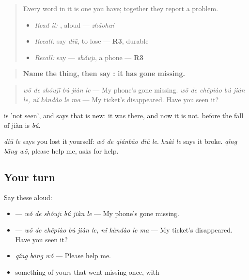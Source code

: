 \begin{quote}
Every word in it is one you have; together they report a problem.

\begin{itemize}
\raggedright
  \item \emph{Read it:} , aloud — \emph{zhǎohuí}
  \item \emph{Recall:} say \emph{diū}, to lose — \textbf{R3}, durable
  \item \emph{Recall:} say  — \emph{shǒujī}, a phone — \textbf{R3}
\end{itemize}
\end{quote}

\begin{grammarlens}[title={Grammar Lens: …\zh{不见了}, it has gone missing}]
\begin{quote}
\textbf{Name the thing, then say : it has gone missing.}
\end{quote}

\begin{quote}
\textbf{} \emph{wǒ de shǒujī bú jiàn le} — My phone's gone missing. \textbf{ } \emph{wǒ de chēpiào bú jiàn le, nǐ kàndào le ma} — My ticket's disappeared. Have you seen it?
\end{quote}

 is 'not seen', and  says that is new: it was there, and now it is not.  before the fall of jiàn is \emph{bú}.

\emph{diū le} says you lost it yourself: \emph{wǒ de qiánbāo diū le}. \emph{huài le} says it broke. \emph{qǐng bāng wǒ}, please help me, asks for help.
\end{grammarlens}

\subsection*{Your turn}
Say these aloud:

\begin{itemize}
\raggedright
  \item {} — \emph{wǒ de shǒujī bú jiàn le} — My phone's gone missing.
  \item {}  — \emph{wǒ de chēpiào bú jiàn le, nǐ kàndào le ma} — My ticket's disappeared. Have you seen it?
  \item \emph{qǐng bāng wǒ} — Please help me.
  \item something of yours that went missing once, with 
\end{itemize}

